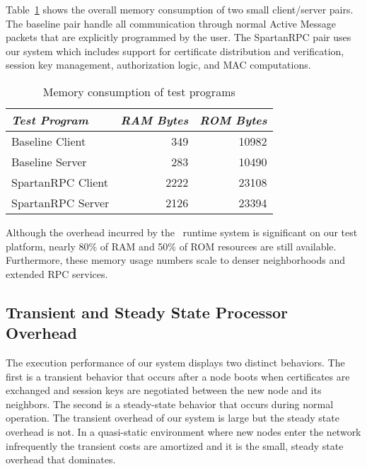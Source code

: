 Table~\ref{table-test-program-ram} shows the overall memory
consumption of two small client/server pairs. The baseline pair handle
all communication through normal Active Message packets that are
explicitly programmed by the user. The SpartanRPC pair uses our system
which includes support for certificate distribution and verification,
session key management, authorization logic, and MAC computations.

\begin{table}[!t]
  \newcommand\T{\rule{0pt}{2.1ex}}
  \centering
  \caption{Memory consumption of test programs}
  {
  \begin{tabular}{|l|r|r|} \hline
    \textit{Test Program} \T & \textit{RAM Bytes} & \textit{ROM Bytes} \\
    \hline \hline

    Baseline Client   \T &  349 & 10982 \\ \hline 
    Baseline Server   \T &  283 & 10490 \\ \hline
    SpartanRPC Client \T & 2222 & 23108 \\ \hline
    SpartanRPC Server \T & 2126 & 23394 \\ \hline
  \end{tabular}
  }
  \label{table-test-program-ram}
\end{table}

Although the overhead incurred by the \Sprocket\ runtime system is
significant on our test platform, nearly 80\% of RAM and 50\% of ROM
resources are still available. Furthermore, these memory usage numbers
scale to denser neighborhoods and extended RPC services.


\subsection{Transient and Steady State Processor Overhead} 

The execution performance of our system displays two distinct
behaviors.  The first is a transient behavior that occurs after a node
boots when certificates are exchanged and session keys are negotiated
between the new node and its neighbors. The second is a steady-state
behavior that occurs during normal operation. The transient overhead
of our system is large but the steady state overhead is not. In a
quasi-static environment where new nodes enter the network
infrequently the transient costs are amortized and it is the small,
steady state overhead that dominates.

